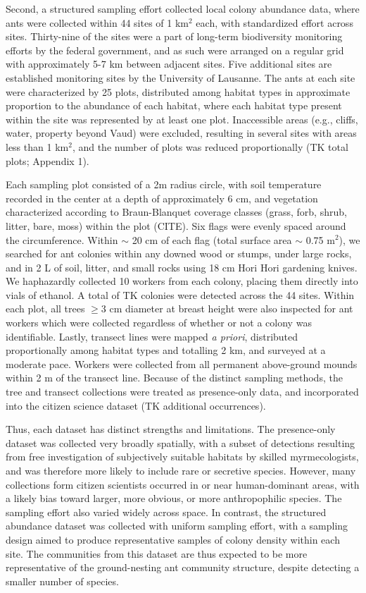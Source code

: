 \documentclass[preprint,review,times,12pt]{elsarticle}
\begin{document}
Second, a structured sampling effort collected local colony abundance data, where ants were collected within 44 sites of 1 km$^2$ each, with standardized effort across sites. Thirty-nine of the sites were a part of long-term biodiversity monitoring efforts by the federal government, and as such were arranged on a regular grid with approximately 5-7 km between adjacent sites. Five additional sites are established monitoring sites by the University of Lausanne. The ants at each site were characterized by 25 plots, distributed among habitat types in approximate proportion to the abundance of each habitat, where each habitat type present within the site was represented by at least one plot. Inaccessible areas (e.g., cliffs, water, property beyond Vaud) were excluded, resulting in several sites with areas less than 1 km$^2$, and the number of plots was reduced proportionally (TK total plots; Appendix 1). 

Each sampling plot consisted of a 2m radius circle, with soil temperature recorded in the center at a depth of approximately 6 cm, and vegetation characterized according to Braun-Blanquet coverage classes (grass, forb, shrub, litter, bare, moss) within the plot (CITE). Six flags were evenly spaced around the circumference. Within $\sim$ 20 cm of each flag (total surface area $\sim$ 0.75 m$^2$), we searched for ant colonies within any downed wood or stumps, under large rocks, and in 2 L of soil, litter, and small rocks using 18 cm Hori Hori gardening knives. We haphazardly collected 10 workers from each colony, placing them directly into vials of ethanol. A total of TK colonies were detected across the 44 sites. Within each plot, all trees $\geq$3 cm diameter at breast height were also inspected for ant workers which were collected regardless of whether or not a colony was identifiable. Lastly, transect lines were mapped \emph{a priori}, distributed proportionally among habitat types and totalling 2 km, and surveyed at a moderate pace. Workers were collected from all permanent above-ground mounds within 2 m of the transect line. Because of the distinct sampling methods, the tree and transect collections were treated as presence-only data, and incorporated into the citizen science dataset (TK additional occurrences). 

Thus, each dataset has distinct strengths and limitations. The presence-only dataset was collected very broadly spatially, with a subset of detections resulting from free investigation of subjectively suitable habitats by skilled myrmecologists, and was therefore more likely to include rare or secretive species. However, many collections form citizen scientists occurred in or near human-dominant areas, with a likely bias toward larger, more obvious, or more anthropophilic species. The sampling effort also varied widely across space. In contrast, the structured abundance dataset was collected with uniform sampling effort, with a sampling design aimed to produce representative samples of colony density within each site. The communities from this dataset are thus expected to be more representative of the ground-nesting ant community structure, despite detecting a smaller number of species. 
\end{document}
